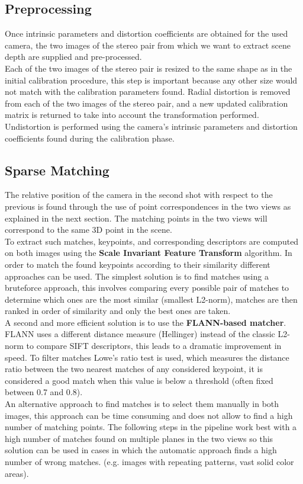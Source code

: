 \documentclass[12pt]{amsart}
\begin{document}
\subsection{Preprocessing}
Once intrinsic parameters and distortion coefficients are obtained for the used camera, 
the two images of the stereo pair from which we want to extract scene depth are supplied and pre-processed.
\\
Each of the two images of the stereo pair is resized to the same shape as in the initial calibration procedure, this step is important because any other size would not match
with the calibration parameters found.
Radial distortion is removed from each of the two images of the stereo pair, 
and a new updated calibration matrix is returned to take into account the transformation performed.
Undistortion is performed using the camera's intrinsic parameters and distortion coefficients found during the calibration phase.
\subsection{Sparse Matching}
The relative position of the camera in the second shot with respect to the previous is found through the use of point correspondences in the two views as explained in the next section.
The matching points in the two views will correspond to the same 3D point in the scene.
\\To extract such matches, keypoints, and corresponding descriptors are computed on both images using the \textbf{Scale Invariant Feature Transform} algorithm.
In order to match the found keypoints according to their similarity different approaches can be used. The simplest solution is to find matches using a bruteforce approach,
this involves comparing every possible pair of matches to determine which ones are the most similar (smallest L2-norm), matches are then ranked in order of similarity and only the best ones are taken.
\\
A second and more efficient solution is to use the \textbf{FLANN-based matcher}. FLANN uses a different distance measure (Hellinger) instead of the classic L2-norm to compare SIFT descriptors, 
this leads to a dramatic improvement in speed. To filter matches Lowe's ratio test is used, which measures the distance ratio between the two nearest matches of any considered
keypoint, it is considered a good match when this value is below a threshold (often fixed between 0.7 and 0.8).
\\
An alternative approach to find matches is to select them manually in both images, this approach can be time consuming and does not allow to find a high number of matching points.
The following steps in the pipeline work best with a high number of matches found on multiple planes in the two views so this solution can be used in cases in which the automatic approach 
finds a high number of wrong matches. (e.g. images with repeating patterns, vast solid color areas).
\end{document}
